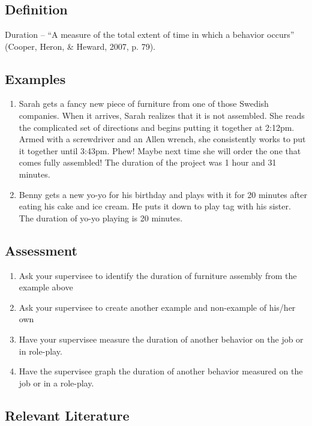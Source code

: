 \clearpage \section{\fouraThree{}}
\subsection{Definition}
Duration – ``A measure of the total extent of time in which a behavior occurs'' (Cooper, Heron, \& Heward, 2007, p. 79).
%
\subsection{Examples}
\begin{enumerate}
\item Sarah gets a fancy new piece of furniture from one of those Swedish companies.  When it arrives, Sarah realizes that it is not assembled.  She reads the complicated set of directions and begins putting it together at 2:12pm. Armed with a screwdriver and an Allen wrench, she consistently works to put it together until 3:43pm. Phew! Maybe next time she will order the one that comes fully assembled! The duration of the project was 1 hour and 31 minutes.
\item Benny gets a new yo-yo for his birthday and plays with it for 20 minutes after eating his cake and ice cream. He puts it down to play tag with his sister. The duration of yo-yo playing is 20 minutes.
\end{enumerate}
%
\subsection{Assessment}
\begin{enumerate}
\item Ask your supervisee to identify the duration of furniture assembly from the example above
\item Ask your supervisee to create another example and non-example of his/her own
\item Have your supervisee measure the duration of another behavior on the job or in role-play.
\item Have the supervisee graph the duration of another behavior measured on the job or in a role-play.
\end{enumerate}
%
\subsection{Relevant Literature}
\begin{refsection}
\nocite{cooper2007applied,deleon1999examination}
\printbibliography[heading=none]
\end{refsection}%


